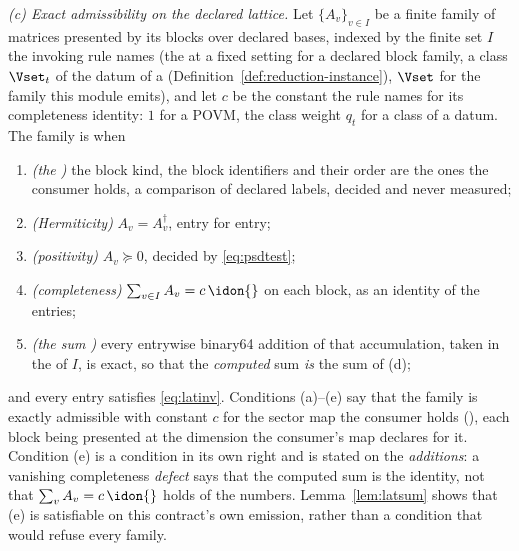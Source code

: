\begin{definition}
\emph{(c) Exact admissibility on the declared lattice.} Let
$\{A_v\}_{v\in I}$ be a finite family of matrices presented by its blocks
over declared bases, indexed by the finite set $I$ the invoking rule names
(the  at a fixed setting for a declared block family, a class
$\Vset_t$ of the datum of a 
(Definition~\ref{def:reduction-instance}), $\Vset$ for the family this module
emits), and let $c$ be the constant the rule names for its completeness
identity: $1$ for a POVM, the class weight $q_t$ for a
class of a datum. The family is
when
\begin{enumerate}[label=(\alph*),leftmargin=2.4em]
\item \emph{(the )} the block kind, the block identifiers and their
  order are the ones the consumer holds, a comparison of declared labels,
  decided and never measured;
\item \emph{(Hermiticity)} $A_v=A_v^{\dagger}$, entry for entry;
\item \emph{(positivity)} $A_v\succeq0$, decided by \eqref{eq:psdtest};
\item \emph{(completeness)} $\sum_{v\in I}A_v=c\,\idon{}$ on each block, as an
  identity of the entries;
\item \emph{(the sum )} every entrywise binary64
  addition of that accumulation, taken in the  of $I$,
  is exact, so that the \emph{computed} sum \emph{is} the sum of (d);
\end{enumerate}
and every entry satisfies \eqref{eq:latinv}. Conditions (a)--(e) say that
the family is exactly admissible with constant $c$ for the sector map the
consumer holds (), each block being
presented at the dimension the consumer's map declares for it. Condition (e)
is a condition in its own right and is stated on the \emph{additions}: a
vanishing completeness \emph{defect} says that the computed sum is the
identity, not that $\sum_vA_v=c\,\idon{}$ holds of the numbers.
Lemma~\ref{lem:latsum} shows that (e) is satisfiable on this
contract's own emission, rather than a condition that would refuse every
family.


\end{definition}
